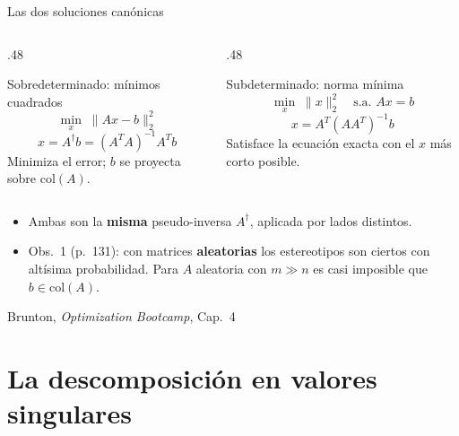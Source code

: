 \documentclass[10pt,aspectratio=169]{beamer}
\newcommand{\fuente}{\vfill{\scriptsize\color{gray}Brunton, \emph{Optimization Bootcamp}, Cap.~4}}
\newcommand{\col}{\mathrm{col}}
\begin{document}
\begin{frame}{Las dos soluciones canónicas}
  \small
  \begin{columns}[T,onlytextwidth]
    \begin{column}{.48\textwidth}
      \begin{block}{Sobredeterminado: mínimos cuadrados}
        \[
          \min_x \; \|Ax-b\|_2^2
        \]
        \[
          x = A^{\dagger}b = (A^TA)^{-1}A^Tb
        \]
        \scriptsize Minimiza el error; $b$ se proyecta sobre $\col(A)$.
      \end{block}
    \end{column}
    \begin{column}{.48\textwidth}
      \begin{block}{Subdeterminado: norma mínima}
        \[
          \min_x \; \|x\|_2^2 \quad \text{s.a. } Ax=b
        \]
        \[
          x = A^T(AA^T)^{-1}b
        \]
        \scriptsize Satisface la ecuación exacta con el $x$ más corto posible.
      \end{block}
    \end{column}
  \end{columns}

  \vspace{1mm}
  \begin{itemize}
    \item Ambas son la \textbf{misma} pseudo-inversa $A^{\dagger}$, aplicada por
      lados distintos.
    \item Obs.~1 (p.~131): con matrices \textbf{aleatorias} los estereotipos son
      ciertos con altísima probabilidad. Para $A$ aleatoria con $m \gg n$ es
      casi imposible que $b \in \col(A)$.
  \end{itemize}
  \fuente
\end{frame}

\section{La descomposición en valores singulares}
\end{document}
